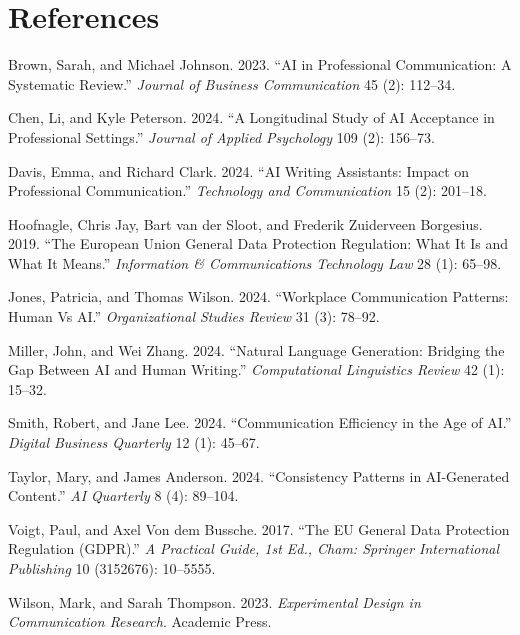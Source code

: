 \documentclass[
]{article}
\newlength{\cslhangindent}
\newenvironment{CSLReferences}[2] %
 {\begin{list}{}{%
  \setlength{\itemindent}{0pt}
  \setlength{\leftmargin}{0pt}
  \setlength{\parsep}{0pt}
  \ifodd #1
   \setlength{\leftmargin}{\cslhangindent}
   \setlength{\itemindent}{-1\cslhangindent}
  \fi
  \setlength{\itemsep}{#2\baselineskip}}}
 {\end{list}}
\begin{document}
\section*{References}\label{references}

\label{refs}
\begin{CSLReferences}{1}{0}
Brown, Sarah, and Michael Johnson. 2023. {``AI in Professional
Communication: A Systematic Review.''} \emph{Journal of Business
Communication} 45 (2): 112--34.

Chen, Li, and Kyle Peterson. 2024. {``A Longitudinal Study of AI
Acceptance in Professional Settings.''} \emph{Journal of Applied
Psychology} 109 (2): 156--73.

Davis, Emma, and Richard Clark. 2024. {``AI Writing Assistants: Impact
on Professional Communication.''} \emph{Technology and Communication} 15
(2): 201--18.

Hoofnagle, Chris Jay, Bart van der Sloot, and Frederik Zuiderveen
Borgesius. 2019. {``The European Union General Data Protection
Regulation: What It Is and What It Means.''} \emph{Information \&
Communications Technology Law} 28 (1): 65--98.

Jones, Patricia, and Thomas Wilson. 2024. {``Workplace Communication
Patterns: Human Vs AI.''} \emph{Organizational Studies Review} 31 (3):
78--92.

Miller, John, and Wei Zhang. 2024. {``Natural Language Generation:
Bridging the Gap Between AI and Human Writing.''} \emph{Computational
Linguistics Review} 42 (1): 15--32.

Smith, Robert, and Jane Lee. 2024. {``Communication Efficiency in the
Age of AI.''} \emph{Digital Business Quarterly} 12 (1): 45--67.

Taylor, Mary, and James Anderson. 2024. {``Consistency Patterns in
AI-Generated Content.''} \emph{AI Quarterly} 8 (4): 89--104.

Voigt, Paul, and Axel Von dem Bussche. 2017. {``The EU General Data
Protection Regulation (GDPR).''} \emph{A Practical Guide, 1st Ed., Cham:
Springer International Publishing} 10 (3152676): 10--5555.

Wilson, Mark, and Sarah Thompson. 2023. \emph{Experimental Design in
Communication Research}. Academic Press.

\end{CSLReferences}
\end{document}
